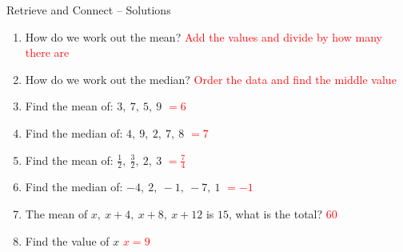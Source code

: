\documentclass{beamer}
\begin{document}
\begin{frame}{Retrieve and Connect -- Solutions}
\vspace{-0.8em}

\footnotesize
\begin{enumerate}\itemsep2pt
  \item How do we work out the mean?  
        \textcolor{red}{Add the values and divide by how many there are}
  \item How do we work out the median?  
        \textcolor{red}{Order the data and find the middle value}
  \item Find the mean of: $3,\ 7,\ 5,\ 9$  
        \textcolor{red}{$=6$}
  \item Find the median of: $4,\ 9,\ 2,\ 7,\ 8$  
        \textcolor{red}{$=7$}
  \item Find the mean of: $\frac{1}{2},\ \frac{3}{2},\ 2,\ 3$  
        \textcolor{red}{$=\frac{7}{4}$}
  \item Find the median of: $-4,\ 2,\ -1,\ -7,\ 1$  
        \textcolor{red}{$=-1$}
  \item The mean of $x,\ x+4,\ x+8,\ x+12$ is $15$, what is the total?  
        \textcolor{red}{$60$}
  \item Find the value of $x$  
        \textcolor{red}{$x=9$}
\end{enumerate}
\end{frame}
\end{document}
